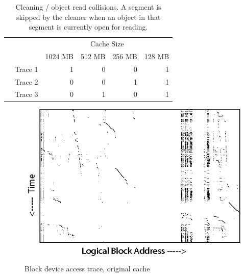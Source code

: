\documentclass[letterpaper,twocolumn,10pt]{article}
\begin{document}
\begin{table}[h]
{\footnotesize
\begin{tabular}{llrrrr}
\cline{2-6}
 &  & \multicolumn{4}{c}{Cache Size}                                                                                     \\ \cline{2-6} 
 &        & \multicolumn{1}{l}{1024 MB} & \multicolumn{1}{l}{512 MB} & \multicolumn{1}{l}{256 MB} & \multicolumn{1}{l}{128 MB} \\
 & Trace 1      & 1                           & 0                          & 0                          & 1                          \\
 & Trace 2      & 0                           & 0                          & 1                          & 1                          \\
 & Trace 3      & 0                           & 1                          & 0                          & 1                          \\ \cline{2-6} 
\end{tabular}
}
\label{table:collision}
\caption{Cleaning / object read collisions. A segment is skipped by the cleaner
  when an object in that segment is currently open for reading.}
\label{tab:skips}
\end{table}

\begin{figure}[t]
\centering
\includegraphics[width=0.8\columnwidth]{graphs/disk.png}
\caption{Block device access trace, original cache}
\label{fig:blktrace:disk}
\end{figure}
\end{document}
